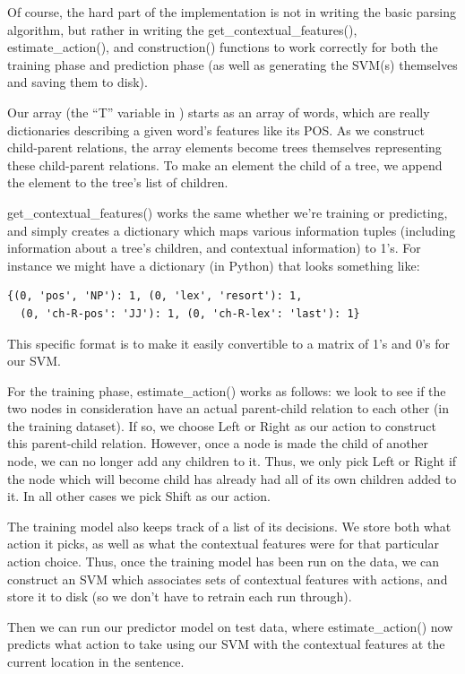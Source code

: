 \documentclass[12pt]{amsart}
\begin{document}
Of course, the hard part of the implementation is not in writing the basic 
parsing algorithm, but
rather in writing the get\_contextual\_features(), estimate\_action(),
and construction() functions
to work correctly for both the training phase and prediction phase (as well
as generating the SVM(s) themselves and saving them to disk).

Our array (the ``T'' variable in \cite{yamada2003statistical}) 
starts as an array of words, which are really
dictionaries describing a given word's features like its POS. As we construct
child-parent relations, the array elements become trees themselves representing
these child-parent relations. To make an element the child of a tree, we append 
the element to the tree's list of children.

get\_contextual\_features() works the same whether we're training or predicting,
and simply creates a dictionary which maps various information tuples 
(including information about a tree's children, and contextual information) to
1's. For instance we might have a dictionary (in Python) that looks something 
like:
\begin{verbatim}
{(0, 'pos', 'NP'): 1, (0, 'lex', 'resort'): 1,
  (0, 'ch-R-pos': 'JJ'): 1, (0, 'ch-R-lex': 'last'): 1}
\end{verbatim}
This specific format is to make it easily convertible to a matrix of 1's and 
0's for our SVM.

For the training phase, estimate\_action() works as follows: we look to see if
the two nodes in consideration have an actual parent-child relation to each 
other (in the training dataset). If so, we choose Left or Right as our action 
to construct this parent-child relation. However, once a node is made the 
child of another node, we can no longer add any children to it. Thus, we only
pick Left or Right if the node which will become child has already had all of
its own children added to it. In all other cases we pick Shift as our action.

The training model also keeps track of a list of its decisions. We store both
what action it picks, as well as what the contextual features were for that
particular action choice. Thus, once the training model has been run on the
data, we can construct an SVM which associates sets of contextual features 
with actions, and store it to disk (so we don't have to retrain each run
through).

Then we can run our predictor model on test data, where estimate\_action()
now predicts what action to take using our SVM with the contextual
features at the current location in the sentence.
\end{document}
